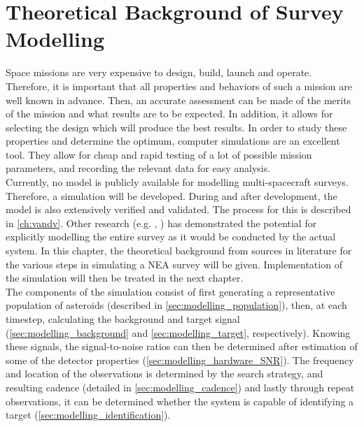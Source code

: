 \chapter{Theoretical Background of Survey Modelling}
\label{ch:surveymodelling}

Space missions are very expensive to design, build, launch and operate. Therefore, it is important that all properties and behaviors of such a mission are well known in advance. Then, an accurate assessment can be made of the merits of the mission and what results are to be expected. In addition, it allows for selecting the design which will produce the best results. In order to study these properties and determine the optimum, computer simulations are an excellent tool. They allow for cheap and rapid testing of a lot of possible mission parameters, and recording the relevant data for easy analysis. \\

Currently, no model is publicly available for modelling multi-spacecraft surveys. Therefore, a simulation will be developed. During and after development, the model is also extensively verified and validated. The process for this is described in \autoref{ch:vandv}. Other research (e.g. \cite{Flyeye}, \cite{2017NEOSDT}) has demonstrated the potential for explicitly modelling the entire survey as it would be conducted by the actual system. In this chapter, the theoretical background from sources in literature for the various steps in simulating a NEA survey will be given. Implementation of the simulation will then be treated in the next chapter.\\

The components of the simulation consist of first generating a representative population of asteroids (described in \autoref{sec:modelling_population}), then, at each timestep, calculating the background and target signal (\autoref{sec:modelling_background} and \autoref{sec:modelling_target}, respectively). Knowing these signals, the signal-to-noise ratios can then be determined after estimation of some of the detector properties (\autoref{sec:modelling_hardware_SNR}). The frequency and location of the observations is determined by the search strategy, and resulting cadence (detailed in \autoref{sec:modelling_cadence}) and lastly through repeat observations, it can be determined whether the system is capable of identifying a target (\autoref{sec:modelling_identification}).\\

